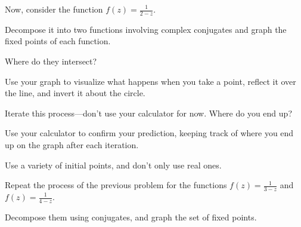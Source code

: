 \documentclass[../key.tex]{subfiles}
\begin{document}
\begin{outer_problem}
\item Now, consider the function $f(z)=\frac{1}{2-z}$.
\end{outer_problem}

\begin{inner_problem}[start=1]
\item Decompose it into two functions involving complex conjugates and graph the fixed points of each function.
\end{inner_problem}

\begin{inner_problem}
\item Where do they intersect?
\end{inner_problem}

\begin{inner_problem}
\item Use your graph to visualize what happens when you take a point, reflect it over the line, and invert it about the circle.
\end{inner_problem}

\begin{inner_problem}
\item Iterate this process---don't use your calculator for now. Where do you end up?
\end{inner_problem}

\begin{inner_problem}
\item Use your calculator to confirm your prediction, keeping track of where you end up on the graph after each iteration.
\end{inner_problem}

\begin{inner_problem}
\item Use a variety of initial points, and don't only use real ones.
\end{inner_problem}

\begin{outer_problem}
\item Repeat the process of the previous problem for the functions $f(z)=\frac{1}{3-z}$ and $f(z)=\frac{1}{4-z}$.
\end{outer_problem}

\begin{inner_problem}[start=1]
\item Decompose them using conjugates, and graph the set of fixed points.
\end{inner_problem}
\end{document}
